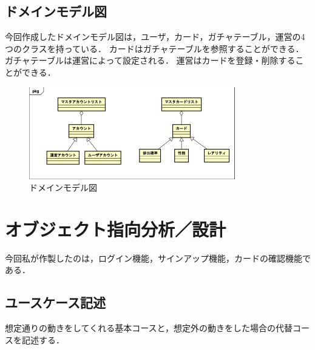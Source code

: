 \documentclass{ltjsarticle}
\begin{document}
\subsection{ドメインモデル図}
今回作成したドメインモデル図は，ユーザ，カード，ガチャテーブル，運営の4つのクラスを持っている．
カードはガチャテーブルを参照することができる．
ガチャテーブルは運営によって設定される．
運営はカードを登録・削除することができる．
\begin{figure}[H]
    \centering
    \includegraphics[width=0.8\textwidth]{src/domainModel.png}
    \caption{ドメインモデル図}
    \label{fig:domain}
\end{figure}

\section{オブジェクト指向分析／設計}
今回私が作製したのは，ログイン機能，サインアップ機能，カードの確認機能である．

\subsection{ユースケース記述}
想定通りの動きをしてくれる基本コースと，想定外の動きをした場合の代替コースを記述する．
\end{document}
